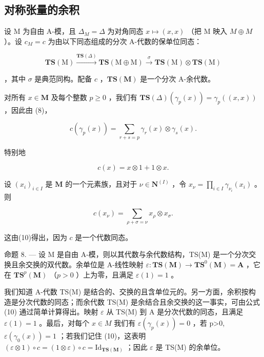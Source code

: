 \subsection{对称张量的余积}

设 M 为自由 A-模，且 \(\Delta_{M} = \Delta\) 为对角同态 \(x \mapsto (x, x)\) （把 M 映入 \(M \oplus M\) ）。设 \(c_{M} = c\) 为由以下同态组成的分次 A-代数的保单位同态：

\[
\mathbf {T S} (\mathrm{M}) \xrightarrow {\mathbf {T S} (\Delta)} \mathbf {T S} (\mathrm{M} \oplus \mathrm{M}) \xrightarrow {\sigma} \mathbf {T S} (\mathrm{M}) \otimes \mathbf {T S} (\mathrm{M})
\]

，其中 \(\sigma\) 是典范同构。配备 \(c\) ，\(\mathbf{TS}(\mathbf{M})\) 是一个分次 A-余代数。

对所有 \(x \in \mathbf{M}\) 及每个整数 \(p \geqslant 0\) ，我们有 \(\mathbf{TS}(\Delta) (\gamma_p(x)) = \gamma_p((x, x))\) ，因此由 (8)，

\[
c \left(\gamma_ {p} (x)\right) = \sum_ {r + s = p} \gamma_ {r} (x) \otimes \gamma_ {s} (x).\tag{10}
\]

特别地

\[
c (x) = x \otimes 1 + 1 \otimes x.\tag{11}
\]

设 \((x_{i})_{i\in I}\) 是 \(\mathbf{M}\) 的一个元素族，且对于 \(\nu \in \mathbf{N}^{(I)}\) ，令 \(x_{\nu} = \prod_{i\in I}\gamma_{\nu_i}(x_i)\) 。则

\[
c \left(x _ {\nu}\right) = \sum_ {\rho + \sigma = \nu} x _ {\rho} \otimes x _ {\sigma}.\tag{12}
\]

这由(10)得出，因为 \(c\) 是一个代数同态。

命题 8. --- 设 M 是自由 A-模，则以其代数与余代数结构，TS(M) 是一个分次交换且余交换的双代数。余单位是 A-线性映射 \(\varepsilon: \mathbf{TS}(\mathbf{M}) \to \mathbf{TS}^0(\mathbf{M}) = \mathbf{A}\) ，它在 \(\mathbf{TS}^p(\mathbf{M})\) （\(p > 0\) ）上为零，且满足 \(\varepsilon(1) = 1\) 。

我们知道 A-代数 TS(M) 是结合的、交换的且含单位元的。另一方面，余积按构造是分次代数的同态；而余代数 TS(M) 是余结合且余交换的这一事实，可由公式 (10) 通过简单计算得出。映射 \(\varepsilon\) 从 TS(M) 到 A 是分次代数的同态，且满足 \(\varepsilon(1)=1\) 。最后，对每个 \(x\in M\) 我们有 \(\varepsilon(\gamma_{p}(x))=0\) ，若 p\textgreater0, \(\varepsilon(\gamma_{0}(x))=1\) ；若我们记住 (10)，这表明 \((\varepsilon\otimes1)\circ c=(1\otimes\varepsilon)\circ c=\mathrm{Id}_{\mathbf{TS}(\mathbf{M})}\) ；因此 \(\varepsilon\) 是 TS(M) 的余单位。

